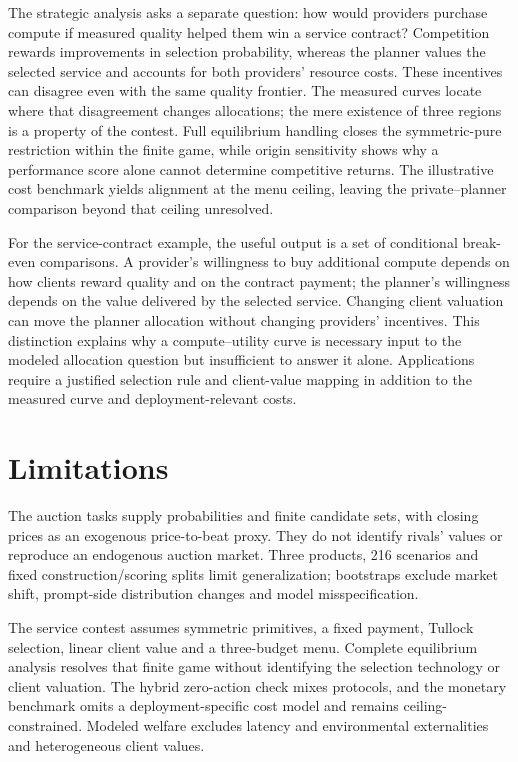 \documentclass{article}
\begin{document}
The strategic analysis asks a separate question: how would providers purchase compute if measured quality helped them win a service contract? Competition rewards improvements in selection probability, whereas the planner values the selected service and accounts for both providers' resource costs. These incentives can disagree even with the same quality frontier. The measured curves locate where that disagreement changes allocations; the mere existence of three regions is a property of the contest. Full equilibrium handling closes the symmetric-pure restriction within the finite game, while origin sensitivity shows why a performance score alone cannot determine competitive returns. The illustrative cost benchmark yields alignment at the menu ceiling, leaving the private--planner comparison beyond that ceiling unresolved.

For the service-contract example, the useful output is a set of conditional break-even comparisons. A provider's willingness to buy additional compute depends on how clients reward quality and on the contract payment; the planner's willingness depends on the value delivered by the selected service. Changing client valuation can move the planner allocation without changing providers' incentives. This distinction explains why a compute--utility curve is necessary input to the modeled allocation question but insufficient to answer it alone. Applications require a justified selection rule and client-value mapping in addition to the measured curve and deployment-relevant costs.

\section{Limitations}

The auction tasks supply probabilities and finite candidate sets, with closing prices as an exogenous price-to-beat proxy. They do not identify rivals' values or reproduce an endogenous auction market. Three products, 216 scenarios and fixed construction/scoring splits limit generalization; bootstraps exclude market shift, prompt-side distribution changes and model misspecification.

The service contest assumes symmetric primitives, a fixed payment, Tullock selection, linear client value and a three-budget menu. Complete equilibrium analysis resolves that finite game without identifying the selection technology or client valuation. The hybrid zero-action check mixes protocols, and the monetary benchmark omits a deployment-specific cost model and remains ceiling-constrained. Modeled welfare excludes latency and environmental externalities and heterogeneous client values.
\end{document}
